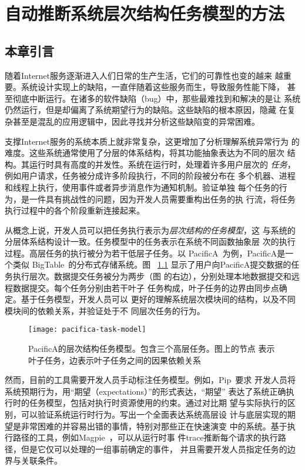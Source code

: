 \chapter{自动推断系统层次结构任务模型的方法}
\label{chap:scalpel}

\section{本章引言}

随着Internet服务逐渐进入人们日常的生产生活，它们的可靠性也变的越来
越重要。系统设计实现上的缺陷，一直伴随着这些服务而生，导致服务性能下降，
甚至彻底中断运行。在诸多的软件缺陷（bug）中，那些最难找到和解决的是让
系统仍然运行，但是却偏离了系统期望行为的缺陷。这些缺陷的根本原因，隐藏
在复杂甚至是混乱的应用逻辑中，因此寻找并分析这些缺陷变的异常困难。

支撑Internet服务的系统本质上就非常复杂，这更增加了分析理解系统异常行为
的难度。这些系统通常使用了分层的体系结构，将其功能抽象表达为不同的层次
结构。其运行时具有高度的并发性。系统在运行时，处理着许多用户层次的
\emph{任务}，例如用户请求，任务被分成许多阶段执行，不同的阶段被分布在
多个机器、进程和线程上执行，使用事件或者异步消息作为通知机制。验证单独
每个任务的行为，是一件具有挑战性的问题，因为开发人员需要重构出任务的执
行流，将任务执行过程中的各个阶段重新连接起来。

从概念上说，开发人员可以把任务执行表示为\emph{层次结构的任务模型}，这
与系统的分层体系结构设计一致。任务模型中的任务表示在系统不同函数抽象层
次的执行过程。高层任务的执行被分为若干低层子任务。以
PacificA~\cite{pacifica}为例，PacificA是一个类似
BigTable~\cite{bigtable}的分布式存储系统。图~ \ref{fig:pacifica_model}
显示了用户向PacificA提交数据的任务执行层次。数据提交任务被分为两步（图
的右边），分别处理本地数据提交和远程数据提交。每个任务分别由若干{叶子
任务}构成，叶子任务的边界由{同步点}确定。基于任务模型，开发人员可以
更好的理解系统层次模块间的结构，以及不同模块间的依赖关系，并验证处于不
同层次任务的行为。

\begin{figure}
  \centering
  \begin{minipage}{0.8\linewidth}
    \centering
    \texttt{[image: pacifica-task-model]}
    \caption{PacificA的层次结构任务模型。包含三个高层任务。图上的节点
    表示叶子任务，边表示叶子任务之间的因果依赖关系}
    \label{fig:pacifica_model}
  \end{minipage}
\end{figure}

然而，目前的工具需要开发人员手动标注任务模型。例如，Pip~\cite{pip}要求
开发人员将系统预期行为，用“期望（expectations）”的形式表达，“期望”
表达了系统正确执行时的任务模型，包括对执行时资源使用的约束。通过对比期
望与实际执行的区别，可以验证系统运行时行为。写出一个全面表达系统高层设
计与底层实现的期望是非常困难的并容易出错的事情，特别对那些正在快速演变
中的系统。基于执行路径的工具，例如Magpie~\cite{magpie}，可以从运行时事
件trace推断每个请求的执行路径，但是它仅可以处理的一组事前确定的事件，
并且需要开发人员指定任务的边界与关联条件。

